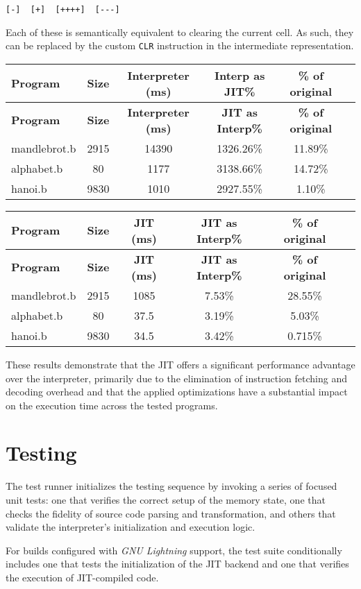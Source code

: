 \begin{verbatim}
[-]  [+]  [++++]  [---]
\end{verbatim}

\par Each of these is semantically equivalent to clearing the current cell. As such, they can be replaced by the custom \texttt{CLR} instruction in the intermediate representation.

\begin{longtable}{|l|c|c|c|c|c|}
\hline
\textbf{Program} & \textbf{Size} & \textbf{Interpreter (ms)} & \textbf{Interp as JIT\%} & \textbf{\% of original} \\
\hline
\endfirsthead
\hline
\textbf{Program} & \textbf{Size} & \textbf{Interpreter (ms)} & \textbf{JIT as Interp\%} & \textbf{\% of original} \\
\hline
\endhead
\hline
\endfoot
mandlebrot.b & 2915  & 14390 & 1326.26\% & 11.89\% \\
alphabet.b   & 80    & 1177  & 3138.66\% & 14.72\% \\
hanoi.b      & 9830  & 1010  & 2927.55\% & 1.10\% \\
\hline
\end{longtable}

\begin{longtable}{|l|c|c|c|c|c|}
\hline
\textbf{Program} & \textbf{Size} & \textbf{JIT (ms)} & \textbf{JIT as Interp\%} & \textbf{\% of original} \\
\hline
\endfirsthead
\hline
\textbf{Program} & \textbf{Size} & \textbf{JIT (ms)} & \textbf{JIT as Interp\%} & \textbf{\% of original} \\
\hline
\endhead
\hline
\endfoot
mandlebrot.b & 2915  & 1085   & 7.53\%  & 28.55\% \\
alphabet.b   & 80    & 37.5   & 3.19\%  & 5.03\% \\
hanoi.b      & 9830  & 34.5   & 3.42\%  & 0.715\% \\
\hline
\end{longtable}

\par These results demonstrate that the JIT offers a significant performance advantage over the interpreter, primarily due to the elimination of instruction fetching and decoding overhead and that the applied optimizations have a substantial impact on the execution time across the tested programs.

\section{Testing}
\label{sec:ch2sec4}

\par The test runner initializes the testing sequence by invoking a series of focused unit tests: one that verifies the correct setup of the memory state, one that checks the fidelity of source code parsing and transformation, and others that validate the interpreter's initialization and execution logic.

\par For builds configured with \textit{GNU Lightning} support, the test suite conditionally includes one that tests the initialization of the JIT backend and one that verifies the execution of JIT-compiled code.